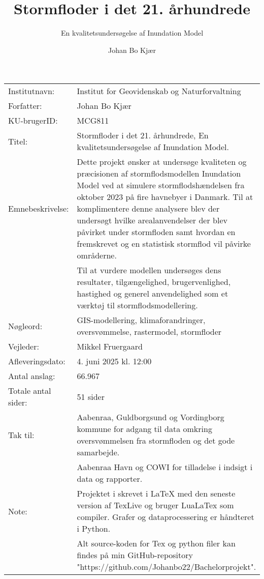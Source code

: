 \documentclass[12pt]{article}
\author{Johan Bo Kjær}
\title{Stormfloder i det 21. århundrede}
\subtitle{En kvalitetsundersøgelse af Inundation Model}
\begin{document}
\maketitle


\onehalfspacing


\begin{table}[h]
\def\arraystretch{1.5}
\begin{tabularx}{\textwidth}{l X}
Institutnavn: & {Institut for Geovidenskab og Naturforvaltning}  \\
Forfatter: & {Johan Bo Kjær} \\
KU-brugerID: & {MCG811} \\
Titel: & {Stormfloder i det 21. århundrede, En kvalitetsundersøgelse af Inundation Model.} \\
Emnebeskrivelse: & Dette projekt ønsker at undersøge kvaliteten og præcisionen af stormflodsmodellen Inundation Model ved at simulere stormflodshændelsen fra oktober 2023 på fire havnebyer i Danmark. Til at komplimentere denne analysere blev der undersøgt hvilke arealanvendelser der blev påvirket under stormfloden samt hvordan en fremskrevet og en statistisk stormflod vil påvirke områderne.\\
& Til at vurdere modellen undersøges dens resultater, tilgængelighed, brugervenlighed, hastighed og generel anvendelighed som et værktøj til stormflodsmodellering.\\  
Nøgleord: & GIS-modellering, klimaforandringer, oversvømmelse, rastermodel, stormfloder \\
Vejleder: & Mikkel Fruergaard \\
Afleveringsdato: & 4. juni 2025 kl. 12:00 \\
Antal anslag: & 66.967 \\
Totale antal sider: & 51 sider \\
Tak til: & Aabenraa, Guldborgsund og Vordingborg kommune for adgang til data omkring oversvømmelsen fra stormfloden og det gode samarbejde.\\
& Aabenraa Havn og COWI for tilladelse i indsigt i data og rapporter. \\
Note: & Projektet i skrevet i LaTeX med den seneste version af TexLive og bruger LuaLaTex som compiler. Grafer og dataprocessering er håndteret i Python.\\
& Alt source-koden for Tex og python filer kan findes på min GitHub-repository "https://github.com/Johanbo22/Bachelorprojekt". 
\end{tabularx} 
\end{table}
\end{document}
